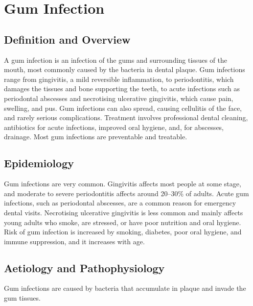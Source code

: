 \chapter{Gum Infection}

\section*{Definition and Overview}
A gum infection is an infection of the gums and surrounding tissues of the mouth, most commonly caused by the bacteria in dental plaque. Gum infections range from gingivitis, a mild reversible inflammation, to periodontitis, which damages the tissues and bone supporting the teeth, to acute infections such as periodontal abscesses and necrotising ulcerative gingivitis, which cause pain, swelling, and pus. Gum infections can also spread, causing cellulitis of the face, and rarely serious complications. Treatment involves professional dental cleaning, antibiotics for acute infections, improved oral hygiene, and, for abscesses, drainage. Most gum infections are preventable and treatable.

\section*{Epidemiology}
Gum infections are very common. Gingivitis affects most people at some stage, and moderate to severe periodontitis affects around 20--30\% of adults. Acute gum infections, such as periodontal abscesses, are a common reason for emergency dental visits. Necrotising ulcerative gingivitis is less common and mainly affects young adults who smoke, are stressed, or have poor nutrition and oral hygiene. Risk of gum infection is increased by smoking, diabetes, poor oral hygiene, and immune suppression, and it increases with age.

\section*{Aetiology and Pathophysiology}
Gum infections are caused by bacteria that accumulate in plaque and invade the gum tissues.

